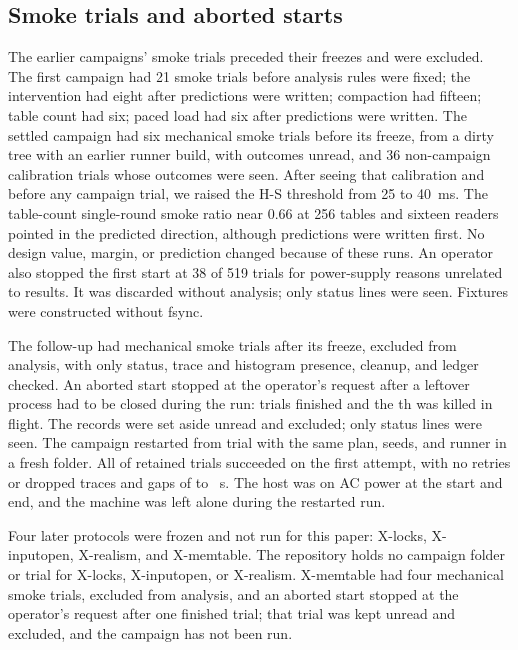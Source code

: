 \subsection{Smoke trials and aborted starts}
The earlier campaigns' smoke trials preceded their freezes and were excluded. The first campaign had 21 smoke trials before analysis rules were fixed; the intervention had eight after predictions were written; compaction had fifteen; table count had six; paced load had six after predictions were written. The settled campaign had six mechanical smoke trials before its freeze, from a dirty tree with an earlier runner build, with outcomes unread, and 36 non-campaign calibration trials whose outcomes were seen. After seeing that calibration and before any campaign trial, we raised the H-S threshold from 25 to 40~ms. The table-count single-round smoke ratio near 0.66 at 256 tables and sixteen readers pointed in the predicted direction, although predictions were written first. No design value, margin, or prediction changed because of these runs. An operator also stopped the first start at 38 of 519 trials for power-supply reasons unrelated to results. It was discarded without analysis; only status lines were seen. Fixtures were constructed without fsync.

The follow-up had \FollowSmoke{} mechanical smoke trials after its freeze, excluded from analysis, with only status, trace and histogram presence, cleanup, and ledger checked. An aborted start stopped at the operator's request after a leftover process had to be closed during the run: \FollowAbortedFinished{} trials finished and the \FollowAbortedKilled{}th was killed in flight. The records were set aside unread and excluded; only status lines were seen. The campaign restarted from trial \FollowOne{} with the same plan, seeds, and runner in a fresh folder. All \FollowSuccesses{} of \FollowTrials{} retained trials succeeded on the first attempt, with no retries or dropped traces and gaps of \FollowGapMin{} to \FollowGapMax{}~s. The host was on AC power at the start and end, and the machine was left alone during the restarted run.

Four later protocols were frozen and not run for this paper: X-locks, X-inputopen, X-realism, and X-memtable. The repository holds no campaign folder or trial for X-locks, X-inputopen, or X-realism. X-memtable had four mechanical smoke trials, excluded from analysis, and an aborted start stopped at the operator's request after one finished trial; that trial was kept unread and excluded, and the campaign has not been run.

